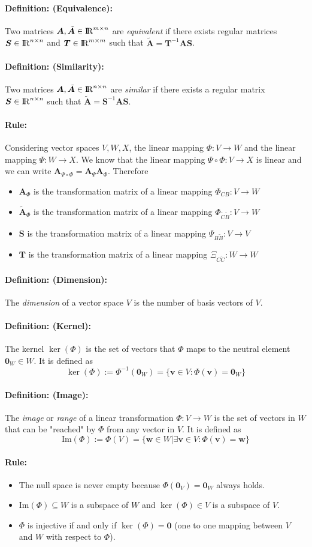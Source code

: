 \documentclass[12pt]{article}
\newcommand{\R}{{\rm I\!R}}
\newcommand{\A}{{\bm{A}}}
\newcommand{\xdefinition}[2]{\paragraph{\colorbox{#1!30}{\textbf{Definition:}} (#2):}}
\newcommand{\xrule}[1]{\paragraph{\colorbox{#1!30}{\textbf{Rule:}}}}
\begin{document}
\xdefinition{blue}{Equivalence} Two matrices $\A, \tilde{\A} \in \R^{m \times n}$ are \textit{equivalent} if there exists regular matrices $\bm{S} \in \R^{n \times n}$ and $\bm{T} \in \R^{m \times m}$ such that $\tilde{\bm{A}} = \bm{T}^{-1} \A \bm{S}$.

\xdefinition{green}{Similarity} Two matrices $\A, \tilde{\A} \in \R^{n \times n}$ are \textit{similar} if there exists a regular matrix $\bm{S} \in \R^{n \times n}$ such that $\tilde{\bm{A}} = \bm{S}^{-1} \A \bm{S}$. 

\xrule{red} Considering vector spaces $V, W, X$, the linear mapping $\Phi : V \rightarrow W$ and the linear mapping $\Psi : W \rightarrow X$. We know that the linear mapping $\Psi \circ \Phi : V \rightarrow X$ is linear and we can write $\A_{\Psi \circ \Phi} = \A_\Psi \A_\Phi$. Therefore
%
\begin{itemize}
	\item $\A_\Phi$ is the transformation matrix of a linear mapping $\Phi_{CB} : V \rightarrow W$
	\item $\tilde{\A}_\Phi$ is the transformation matrix of a linear mapping $\Phi_{\tilde{C}\tilde{B}} : V \rightarrow W$
	\item $\bm{S}$ is the transformation matrix of a linear mapping $\Psi_{B\tilde{B}} : V \rightarrow V$
	\item $\bm{T}$ is the transformation matrix of a linear mapping $\Xi_{C\tilde{C}} : W \rightarrow W$
\end{itemize}

\xdefinition{red}{Dimension} The \textit{dimension} of a vector space $V$ is the number of basis vectors of $V$.

\xdefinition{blue}{Kernel} The kernel $\ker(\Phi)$ is the set of vectors that $\Phi$ maps to the neutral element $\bm{0}_W \in W$. It is defined as
%
\begin{equation}
	\ker(\Phi) := \Phi^{-1}(\bm{0}_W) = \{\bm{v} \in V : \Phi(\bm{v} ) = \bm{0}_W\}
\end{equation}

\xdefinition{blue}{Image} The \textit{image} or \textit{range} of a linear transformation $\Phi : V \rightarrow W$ is the set of vectors in $W$ that can be "reached" by $\Phi$ from any vector in $V$. It is defined as
%
\begin{equation}
	\text{Im}(\Phi) := \Phi(V) = \{\bm{w} \in W | \exists \bm{v} \in V : \Phi(\bm{v}) = \bm{w}\}
\end{equation}

\xrule{red}
%
\begin{itemize}
	\item The null space is never empty because $\Phi(\bm{0}_V) = \bm{0}_W$ always holds.
	\item $\text{Im}(\Phi) \subseteq W$ is a subspace of $W$ and $\ker(\Phi) \in V$ is a subspace of $V$.
	\item $\Phi$ is injective if and only if $\ker(\Phi) = \bm{0}$ (one to one mapping between $V$ and $W$ with respect to $\Phi$).
\end{itemize}
\end{document}
